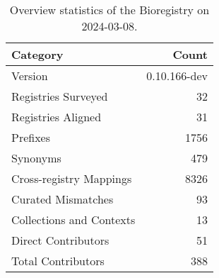\begin{table}
\caption{Overview statistics of the Bioregistry on 2024-03-08.}
\label{tab:bioregistry-summary}
\begin{tabular}{lr}
\toprule
Category & Count \\
\midrule
Version & 0.10.166-dev \\
Registries Surveyed & 32 \\
Registries Aligned & 31 \\
Prefixes & 1756 \\
Synonyms & 479 \\
Cross-registry Mappings & 8326 \\
Curated Mismatches & 93 \\
Collections and Contexts & 13 \\
Direct Contributors & 51 \\
Total Contributors & 388 \\
\bottomrule
\end{tabular}
\end{table}
